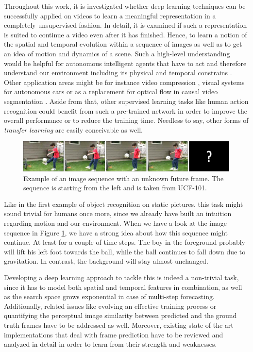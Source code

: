 Throughout this work, it is investigated whether deep learning techniques can be successfully applied on videos to learn a meaningful representation in a completely unsupervised fashion. In detail, it is examined if such a representation is suited to continue a video even after it has finished. Hence, to learn a notion of the spatial and temporal evolution within a sequence of images as well as to get an idea of motion and dynamics of a scene. Such a high-level understanding would be helpful for autonomous intelligent agents that have to act and therefore understand our environment including its physical and temporal constrains \parencite{unsup_learn_lstm}. Other application areas might be for instance video compression \parencite{frame_interpol}, visual systems for autonomous cars or as a replacement for optical flow in causal video segmentation \parencite{causal_video_seg}. Aside from that, other supervised learning tasks like human action recognition could benefit from such a pre-trained network in order to improve the overall performance or to reduce the training time. Needless to say, other forms of \textit{transfer learning} are easily conceivable as well.

\begin{figure}[htpb]
	\centering
	\includegraphics[width=1.0\linewidth]{figures/ucf-intro/serie1.png} 
	\caption[Image Sequence Example]{Example of an image sequence with an unknown future frame. The sequence is starting from the left and is taken from UCF-101.} \label{fig:intro-seq}
\end{figure}

Like in the first example of object recognition on static pictures, this task might sound trivial for humans once more, since we already have built an intuition regarding motion and our environment. When we have a look at the image sequence in Figure \ref{fig:intro-seq}, we have a strong idea about how this sequence might continue. At least for a couple of time steps. The boy in the foreground probably will lift his left foot towards the ball, while the ball continues to fall down due to gravitation. In contrast, the background will stay almost unchanged.

Developing a deep learning approach to tackle this is indeed a non-trivial task, since it has to model both spatial and temporal features in combination, as well as the search space grows exponential in case of multi-step forecasting. Additionally, related issues like evolving an effective training process or quantifying the perceptual image similarity between predicted and the ground truth frames have to be addressed as well. Moreover, existing state-of-the-art implementations that deal with frame prediction have to be reviewed and analyzed in detail in order to learn from their strength and weaknesses.


